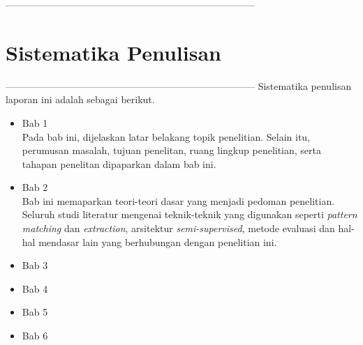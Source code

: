 -----------------------------------------------------------------------------%
\section{Sistematika Penulisan}
-----------------------------------------------------------------------------%
Sistematika penulisan laporan ini adalah sebagai berikut.
\begin{itemize}
	\item Bab 1 \babSatu \\
	Pada bab ini, dijelaskan latar belakang topik penelitian. Selain itu, perumusan masalah, tujuan penelitan, ruang lingkup penelitian, serta tahapan penelitan dipaparkan dalam bab ini.
	\item Bab 2 \babDua \\
	Bab ini memaparkan teori-teori dasar yang menjadi pedoman penelitian. Seluruh studi literatur mengenai teknik-teknik yang digunakan seperti \textit{pattern matching} dan \textit{extraction}, arsitektur \textit{semi-supervised}, metode evaluasi dan hal-hal mendasar lain yang berhubungan dengan penelitian ini.
	\item Bab 3 \babTiga \\
	\item Bab 4 \babEmpat \\
	\item Bab 5 \babLima \\
	\item Bab 6 \babEnam \\
\end{itemize}

